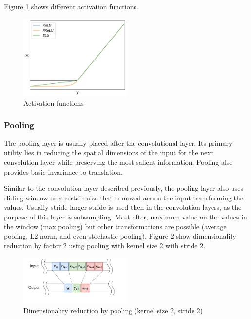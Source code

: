 \documentclass[times, utf8, diplomski, numeric, english]{fer}
\begin{document}
Figure \ref{fg:activations} shows different activation functions.
\begin{figure}[!htb]
	\begin{center}
		\includegraphics[width=0.5\textwidth]{./imgs/activations.png}
		\caption{Activation functions}
		\label{fg:activations}
	\end{center}
\end{figure}


\subsubsection{Pooling}

The pooling layer is usually placed after the convolutional layer. Its primary utility lies in reducing the spatial dimensions of the input for the next convolution layer while preserving the most salient information. Pooling also provides basic invariance to translation.

Similar to the convolution layer described previously, the pooling layer also uses sliding window or a certain size that is moved across the input transforming the values. Usually stride larger stride is used then in the convolution layers, as the purpose of this layer is subsampling. Most ofter, maximum value on the values in the window (max pooling) but other transformations are possible (average pooling, L2-norm, and even stochastic pooling).
Figure \ref{fg:pooling} show dimensionality reduction by factor 2 using pooling with kernel size 2 with stride 2.
\begin{figure}[!htb]
	\begin{center}
		\includegraphics[width=0.5\textwidth]{./imgs/pooling.png}
		\caption{Dimensionality reduction by pooling (kernel size 2, stride 2)}
		\label{fg:pooling}
	\end{center}
\end{figure}
\end{document}
